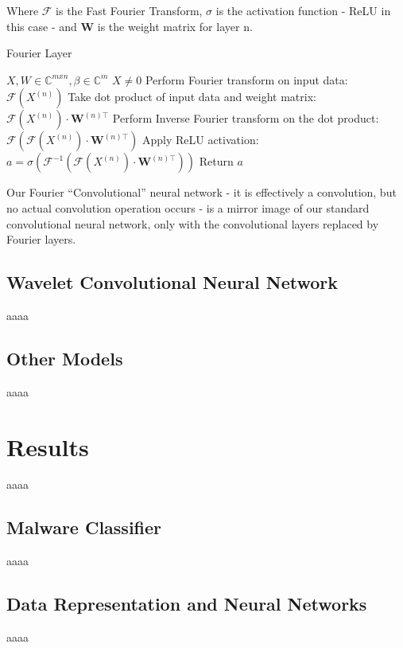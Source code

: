\documentclass[10pt]{article}
\begin{document}
Where $\mathcal{F}$ is the Fast Fourier Transform, $\sigma$ is the activation function - ReLU in this case - and $\mathbf{W}$ is the weight matrix for layer n.

\begin{algorithm}
\caption{Fourier Layer}
\label{Fourier layer}
\begin{algorithmic}[1]
\REQUIRE $X, W \in \mathbb{C}^{mxn}, \beta \in \mathbb{C}^m$
\ENSURE $X \neq 0$
\STATE Perform Fourier transform on input data: $\mathcal{F}(X^{(n)})$
\STATE Take dot product of input data and weight matrix: $\mathcal{F}(X^{(n)})\cdot \mathbf{W}^{(n)\top}$
\STATE Perform Inverse Fourier transform on the dot product: $\mathcal{F}(\mathcal{F}(X^{(n)})\cdot \mathbf{W}^{(n)\top})$
\STATE Apply ReLU activation: $a = \sigma(\mathcal{F}^{-1}(\mathcal{F}(X^{(n)})\cdot \mathbf{W}^{(n)\top}))$
\STATE Return $a$
\end{algorithmic}
\end{algorithm}

Our Fourier ``Convolutional'' neural network - it is effectively a convolution, but no actual convolution operation occurs - is a mirror image of our standard convolutional neural network, only with the convolutional layers replaced by Fourier layers. 

\subsection{Wavelet Convolutional Neural Network} \label{wavelet cnn}
aaaa

\subsection{Other Models} \label{other models}
aaaa

\section{Results}
aaaa

\subsection{Malware Classifier} \label{malware classifier}
aaaa

\subsection{Data Representation and Neural Networks} \label{data representation}
aaaa
\end{document}
